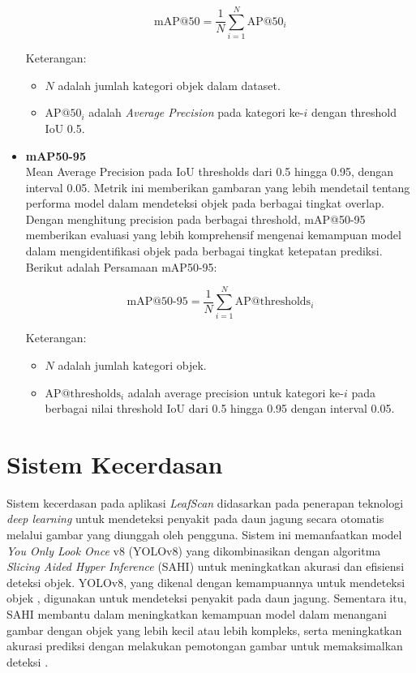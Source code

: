 \documentclass[journal,article,submit,pdftex,moreauthors]{Definitions/mdpi}
\begin{document}
\begin{itemize}
    \[
        \text{mAP@50} = \frac{1}{N} \sum_{i=1}^{N} \text{AP@50}_i
    \]
    
    Keterangan:
    \begin{itemize}
        \setlength{\itemindent}{1em} %
       \item \( N \) adalah jumlah kategori objek dalam dataset.
    \item \( \text{AP@50}_i \) adalah \textit{Average Precision} pada kategori ke-\( i \) dengan threshold IoU 0.5.
    \end{itemize}

    \item \textbf{mAP50-95} \\
    Mean Average Precision pada IoU thresholds dari 0.5 hingga 0.95, dengan interval 0.05. Metrik ini memberikan gambaran yang lebih mendetail tentang performa model dalam mendeteksi objek pada berbagai tingkat overlap. Dengan menghitung precision pada berbagai threshold, mAP@50-95 memberikan evaluasi yang lebih komprehensif mengenai kemampuan model dalam mengidentifikasi objek pada berbagai tingkat ketepatan prediksi\cite{Zhang2021}.
    Berikut adalah Persamaan mAP50-95:
    
    \[
      \text{mAP@50-95} = \frac{1}{N} \sum_{i=1}^{N} \text{AP@thresholds}_i
    \]

    
    Keterangan:
    \begin{itemize}
        \setlength{\itemindent}{1em} %
          \item \( N \) adalah jumlah kategori objek.
    \item \( \text{AP@thresholds}_i \) adalah average precision untuk kategori ke-\( i \) pada berbagai nilai threshold IoU dari 0.5 hingga 0.95 dengan interval 0.05.
    \end{itemize}

    

\end{itemize}


\section{Sistem Kecerdasan}
Sistem kecerdasan pada aplikasi \textit{LeafScan} didasarkan pada penerapan teknologi \textit{deep learning} untuk mendeteksi penyakit pada daun jagung secara otomatis melalui gambar yang diunggah oleh pengguna. Sistem ini memanfaatkan model \textit{You Only Look Once} v8 (YOLOv8) yang dikombinasikan dengan algoritma \textit{Slicing Aided Hyper Inference} (SAHI) untuk meningkatkan akurasi dan efisiensi deteksi objek. YOLOv8, yang dikenal dengan kemampuannya untuk mendeteksi objek \cite{YIN2020}, digunakan untuk mendeteksi penyakit pada daun jagung. Sementara itu, SAHI membantu dalam meningkatkan kemampuan model dalam menangani gambar dengan objek yang lebih kecil atau lebih kompleks, serta meningkatkan akurasi prediksi dengan melakukan pemotongan gambar untuk memaksimalkan deteksi \cite{AKYON2022}.
\end{document}
